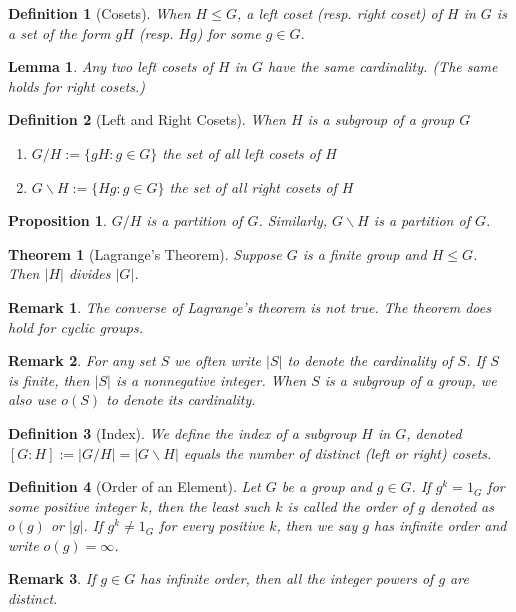 \documentclass[12pt]{article}
\newtheorem{definition}{Definition}[section]
\newtheorem{theorem}{Theorem}[section]
\newtheorem{lemma}{Lemma}[section]
\newtheorem{proposition}{Proposition}[section]
\newtheorem{remark}{Remark}[section]
\begin{document}
\begin{definition}[Cosets]
    When $H \leq G$, a left coset (resp. right coset) of $H$ in $G$ is a set of the form $gH$ (resp. $Hg$) for some $g \in G$.
\end{definition}

\begin{lemma}
Any two left cosets of $H$ in $G$ have the same cardinality.  
(The same holds for right cosets.)
\end{lemma}

\begin{definition}[Left and Right Cosets]
When $H$ is a subgroup of a group $G$
\begin{enumerate}
    \item $G/H := \{gH: g \in G\}$ the set of all left cosets of $H$ 
    \item $G\backslash H := \{Hg: g \in G\}$ the set of all right cosets of $H$
\end{enumerate}
\end{definition}

\begin{proposition}
$G/H$ is a partition of $G$. Similarly, $G\backslash H$ is a partition of $G$.
\end{proposition}

\begin{theorem}[Lagrange’s Theorem]
Suppose $G$ is a finite group and $H \leq G$. Then $|H|$ divides $|G|$.
\end{theorem}

\begin{remark}
The converse of Lagrange's theorem is not true. The theorem does hold for cyclic groups.
\end{remark}

\begin{remark}
For any set $S$ we often write $|S|$ to denote the cardinality of $S$. If $S$ is finite, then $|S|$ is a nonnegative integer. When $S$ is a subgroup of a group, we also use $o(S)$ to denote its cardinality.
\end{remark}

\begin{definition}[Index]
We define the \emph{index} of a subgroup $H$ in $G$, denoted $[G : H] := |G/H| = |G\backslash H|$ equals the number of distinct (left or right) cosets. 
\end{definition}

\begin{definition}[Order of an Element]
Let $G$ be a group and $g \in G$.  
If $g^k = 1_G$ for some positive integer $k$, then the least such $k$ is called the \emph{order} of $g$ denoted as $o(g)$ or $|g|$.
If $g^k \neq 1_G$ for every positive $k$, then we say $g$ has infinite order and write $o(g) = \infty$.
\end{definition}
\begin{remark}
    If $g \in G$ has infinite order, then all the integer powers of $g$ are distinct.
\end{remark}
\end{document}
